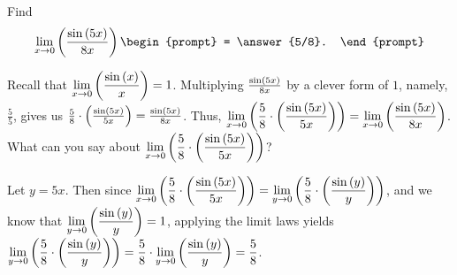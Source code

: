 \documentclass{ximera}
\author{Gregory Hartman \and Matthew Carr}
\begin{document}
\begin{exercise}



Find 
\[
\lim_{x\to0}\p{\frac{\sin\p{5x}}{8x}}
\begin{prompt}
= \answer{5/8}.
\end{prompt}
\]

\begin{hint}
Recall that $\lim_{x\to0}\p{\frac{\sin\p{x}}{x}}=1$. Multiplying $\frac{\sin\left(5x\right)}{8x}$ by a clever form of $1$, namely, $\frac{5}{5}$, gives us $\frac{5}{8}\cdot\left(\frac{\sin\left(5x\right)}{5x}\right)=\frac{\sin\left(5x\right)}{8x}$. Thus, $\lim_{x\to0}\p{\frac{5}{8}\cdot\p{\frac{\sin\p{5x}}{5x}}}=\lim_{x\to0}\p{\frac{\sin\p{5x}}{8x}}$. What can you say about $\lim_{x\to0}\p{\frac{5}{8}\cdot\p{\frac{\sin\p{5x}}{5x}}}$?
\end{hint}
\begin{hint}
Let $y=5x$. Then since $\lim_{x\to0}\p{\frac{5}{8}\cdot\p{\frac{\sin\p{5x}}{5x}}}=\lim_{y\to0}\p{\frac{5}{8}\cdot\p{\frac{\sin\p{y}}{y}}}$, and we know that $\lim_{y\to0}\p{\frac{\sin\p{y}}{y}}=1$, applying the limit laws yields $\lim_{y\to0}\p{\frac{5}{8}\cdot\p{\frac{\sin\p{y}}{y}}}=\frac{5}{8}\cdot\lim_{y\to0}\p{\frac{\sin\p{y}}{y}}=\frac{5}{8}$.
\end{hint}

\end{exercise}
\end{document}
